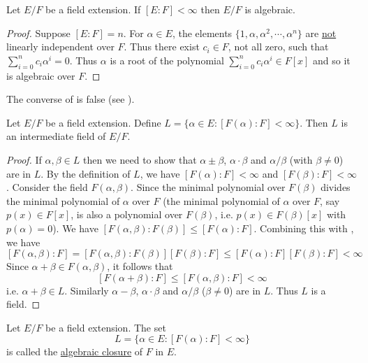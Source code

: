 \documentclass[11pt]{article}
\begin{document}
\begin{theorem}
    Let $E/F$ be a field extension. If $[E:F]<\infty$ then $E/F$ is algebraic.
\end{theorem}

\begin{proof}
    Suppose $[E:F]=n$. For $\alpha\in E$, the elements $\{1,\alpha,\alpha^2,\cdots,\alpha^n\}$ are \ul{not} linearly independent over $F$. Thus there exist $c_i\in F$, not all zero, such that $\sum\limits_{i=0}^nc_i\alpha^i=0$. Thus $\alpha$ is a root of the polynomial $\sum\limits_{i=0}^nc_i\alpha^i\in F[x]$ and so it is algebraic over $F$.
    
\end{proof}

\begin{remark}
    The converse of  is false (see ).
\end{remark}

\begin{theorem}
    Let $E/F$ be a field extension. Define $L=\{\alpha\in E:[F(\alpha):F]<\infty\}$. Then $L$ is an intermediate field of $E/F$.
\end{theorem}

\begin{proof}
    If $\alpha,\beta\in L$ then we need to show that $\alpha\pm\beta$, $\alpha\cdot\beta$ and $\alpha/\beta$ (with $\beta\neq0$) are in $L$. By the definition of $L$, we have $[F(\alpha):F]<\infty$ and $[F(\beta):F]<\infty$. Consider the field $F(\alpha,\beta)$. Since the minimal polynomial over $F(\beta)$ divides the minimal polynomial of $\alpha$ over $F$ (the minimal polynomial of $\alpha$ over $F$, say $p(x)\in F[x]$, is also a polynomial over $F(\beta)$, i.e. $p(x)\in F(\beta)[x]$ with $p(\alpha)=0$). We have $[F(\alpha,\beta):F(\beta)]\leq [F(\alpha):F]$. Combining this with , we have
    \[[F(\alpha,\beta):F]=[F(\alpha,\beta):F(\beta)][F(\beta):F]\leq[F(\alpha):F][F(\beta):F]<\infty\]
    Since $\alpha+\beta\in F(\alpha,\beta)$, it follows that
    \[[F(\alpha+\beta):F]\leq[F(\alpha,\beta):F]<\infty\]
    i.e. $\alpha+\beta\in L$. Similarly $\alpha-\beta$, $\alpha\cdot\beta$ and $\alpha/\beta$ ($\beta\neq0$) are in $L$. Thus $L$ is a field.
    
\end{proof}

\begin{definition}
    Let $E/F$ be a field extension. The set
    \[L=\{\alpha\in E:[F(\alpha):F]<\infty\}\]
    is called the \ul{algebraic closure} of $F$ in $E$.
\end{definition}
\end{document}
